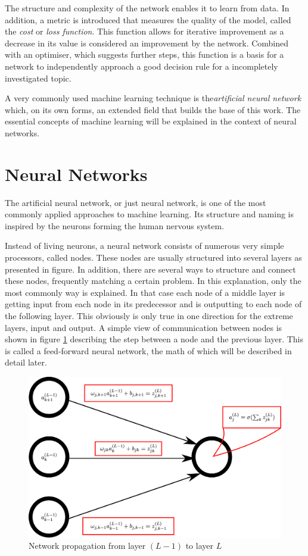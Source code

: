 The structure and complexity of the network enables it to learn from data. In addition, a metric is introduced that measures the quality of the model, called the \emph{cost} or \emph{loss function}. This function allows for iterative improvement as a decrease in its value is considered an improvement by the network. Combined with an optimiser, which suggests further steps, this function is a basis for a network to independently approach a good decision rule for a incompletely investigated topic.

A very commonly used machine learning technique is the\emph{artificial neural network} which, on its own forms, an extended field that builds the base of this work. The essential concepts of machine learning will be explained in the context of neural networks.

\section{Neural Networks}

The artificial neural network, or just neural network, is one of the most commonly applied approaches to machine learning. Its structure and naming is inspired by the neurons forming the human nervous system.

Instead of living neurons, a neural network consists of numerous very simple processors, called nodes.
 These nodes are usually structured into several layers as presented in figure. In addition, there are several ways to structure and connect these nodes, frequently matching a certain problem. In this explanation, only the most commonly way is explained. In that case each node of a middle layer is getting input from each node in its predecessor and is outputting to each node of the following layer. This obviously is only true in one direction for the extreme layers, input and output. A simple view of communication between nodes is shown in figure \ref{fig:nodes_nomenclature} describing the step between a node and the previous layer. This is called a feed-forward neural network, the math of which will be described in detail later.

\begin{figure}[htbp]
	\centering
	\includegraphics[scale=0.18]{figures_ML/nodes_nomenclature.eps}
	\caption[Network parameter nomenclature]{Network propagation from layer $(L-1)$ to layer $L$}
	\label{fig:nodes_nomenclature}
\end{figure}


